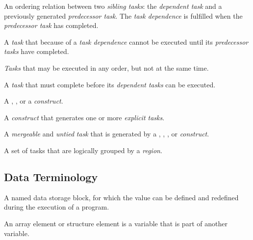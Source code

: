 \glossarydefstart
An ordering relation between two \emph{sibling tasks}: the 
\emph{dependent task} and a previously generated \emph{predecessor task}. 
The \emph{task dependence} is fulfilled when the
\emph{predecessor task} has completed.
\glossarydefend

\begin{samepage}
\glossarydefstart
A \emph{task} that because of a \emph{task dependence} cannot be executed 
until its \emph{predecessor tasks} have completed.
\glossarydefend
\end{samepage}

\glossarydefstart
\emph{Tasks} that may be executed in any order, but not at the same time.
\glossarydefend
\bigskip

\glossarydefstart
A \emph{task} that must complete before its \emph{dependent tasks} can be 
executed.
\glossarydefend

\glossarydefstart
A , , or a  \emph{construct}.
\glossarydefend
\bigskip

\glossarydefstart
A \emph{construct} that generates one or more \emph{explicit tasks}.
\glossarydefend
\bigskip

\glossarydefstart
A \emph{mergeable} and \emph{untied} \emph{task} that is generated by 
a , , , or 
 \emph{construct}.
\glossarydefend

\glossarydefstart
A set of tasks that are logically grouped by a  \emph{region}.
\glossarydefend


\subsection{Data Terminology}
\label{subsec:Data Terminology}
\glossarydefstart
A named data storage block, for which the value can be defined and 
redefined during the execution of a program.

\begin{adjustwidth}{-0.75in}{0in}
\begin{note}
An array element or structure element is a variable that is part of 
another variable.
\end{note}
\end{adjustwidth}
\glossarydefend

